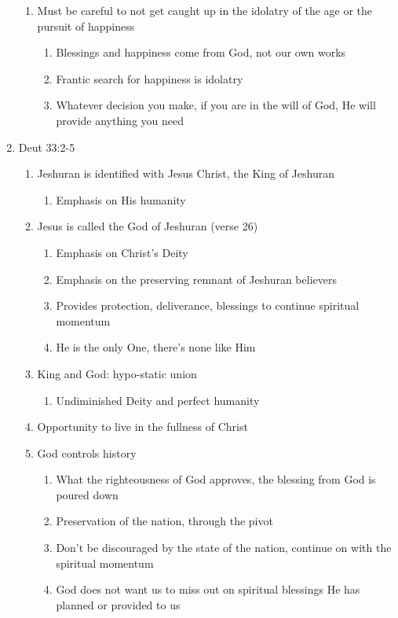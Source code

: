 \documentclass[11pt]{article}
\begin{document}
\begin{enumerate}
\begin{enumerate}
		\item Must be careful to not get caught up in the idolatry of the age or the pursuit of happiness
		\begin{enumerate}
			\item Blessings and happiness come from God, not our own works
			\item Frantic search for happiness is idolatry
			\item Whatever decision you make, if you are in the will of God, He will provide anything you need
		\end{enumerate}	
	\end{enumerate}
	\item Deut 33:2-5
	\begin{enumerate}
		\item Jeshuran is identified with Jesus Christ, the King of Jeshuran
		\begin{enumerate}
			\item Emphasis on His humanity
		\end{enumerate}
		\item Jesus is called the God of Jeshuran (verse 26)
		\begin{enumerate}
			\item Emphasis on Christ's Deity
			\item Emphasis on the preserving remnant of Jeshuran believers
			\item Provides protection, deliverance, blessings to continue spiritual momentum
			\item He is the only One, there's none like Him
		\end{enumerate}
		\item King and God: hypo-static union
		\begin{enumerate}
			\item Undiminished Deity and perfect humanity
		\end{enumerate}
		\item Opportunity to live in the fullness of Christ
		\item God controls history
		\begin{enumerate}
			\item What the righteousness of God approves, the blessing from God is poured down
			\item Preservation of the nation, through the pivot
			\item Don't be discouraged by the state of the nation, continue on with the spiritual momentum
			\item God does not want us to miss out on spiritual blessings He has planned or provided to us

\end{enumerate}
\end{enumerate}
\end{enumerate}
\end{document}
